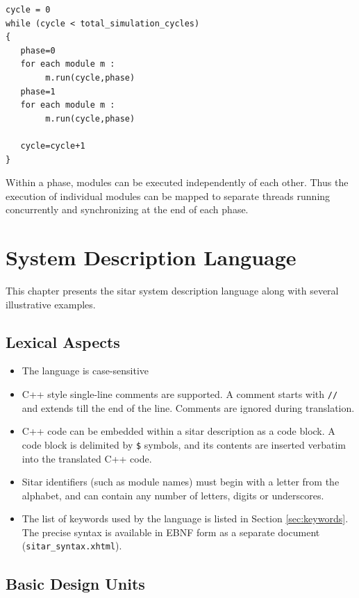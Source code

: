 \documentclass[12pt,a4paper]{report}
\begin{document}
\begin{verbatim}
cycle = 0
while (cycle < total_simulation_cycles)
{
   phase=0
   for each module m :
        m.run(cycle,phase)
   phase=1
   for each module m :
        m.run(cycle,phase)

   cycle=cycle+1
}
\end{verbatim}

Within a phase, modules can be executed independently of each other.
Thus the execution of individual modules can be mapped to 
separate threads running concurrently and synchronizing at the end of each phase.




\chapter{System Description Language} \label{chap:language}

This chapter presents the sitar system description language
along with several illustrative examples.

\section{Lexical Aspects}

\begin{itemize}
\item The language is case-sensitive

\item C++ style single-line comments are supported. A comment starts with {\tt//} 
and extends till the end of the line. Comments are 
ignored during translation.

\item C++ code can be embedded within a sitar description as
a code block. A code block is delimited by {\tt \$} symbols, and its contents
are inserted verbatim into the translated C++ code.

\item Sitar identifiers (such as module names) must begin with a letter from the alphabet, and can contain 
any number of letters, digits or underscores.

\item The list of keywords used by the language is listed in Section \ref{sec:keywords}. 
The precise syntax is available in EBNF form as a separate document
({\tt sitar\_syntax.xhtml}).
\end{itemize}


\section{Basic Design Units}
\end{document}
